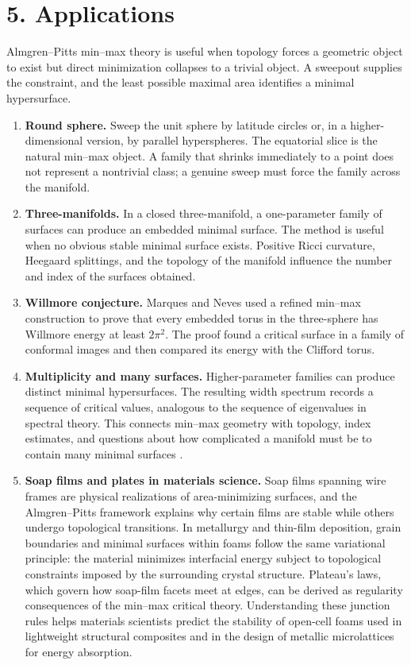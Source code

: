 \section*{5. Applications}
Almgren--Pitts min--max theory is useful when topology forces a geometric object to exist but direct minimization collapses to a trivial object. A sweepout supplies the constraint, and the least possible maximal area identifies a minimal hypersurface.
\begin{enumerate}[leftmargin=*,itemsep=0.35em]
\item \textbf{Round sphere.} Sweep the unit sphere by latitude circles or, in a higher-dimensional version, by parallel hyperspheres. The equatorial slice is the natural min--max object. A family that shrinks immediately to a point does not represent a nontrivial class; a genuine sweep must force the family across the manifold.
\item \textbf{Three-manifolds.} In a closed three-manifold, a one-parameter family of surfaces can produce an embedded minimal surface. The method is useful when no obvious stable minimal surface exists. Positive Ricci curvature, Heegaard splittings, and the topology of the manifold influence the number and index of the surfaces obtained.
\item \textbf{Willmore conjecture.} Marques and Neves used a refined min--max construction to prove that every embedded torus in the three-sphere has Willmore energy at least $2\pi^2$. The proof found a critical surface in a family of conformal images and then compared its energy with the Clifford torus.
\item \textbf{Multiplicity and many surfaces.} Higher-parameter families can produce distinct minimal hypersurfaces. The resulting width spectrum records a sequence of critical values, analogous to the sequence of eigenvalues in spectral theory. This connects min--max geometry with topology, index estimates, and questions about how complicated a manifold must be to contain many minimal surfaces \cite{almgren_pitts_min_max_theory_ref2,almgren_pitts_min_max_theory_ref6}.
\item \textbf{Soap films and plates in materials science.} Soap films spanning wire frames are physical realizations of area-minimizing surfaces, and the Almgren--Pitts framework explains why certain films are stable while others undergo topological transitions. In metallurgy and thin-film deposition, grain boundaries and minimal surfaces within foams follow the same variational principle: the material minimizes interfacial energy subject to topological constraints imposed by the surrounding crystal structure. Plateau's laws, which govern how soap-film facets meet at edges, can be derived as regularity consequences of the min--max critical theory. Understanding these junction rules helps materials scientists predict the stability of open-cell foams used in lightweight structural composites and in the design of metallic microlattices for energy absorption.

\end{enumerate}
